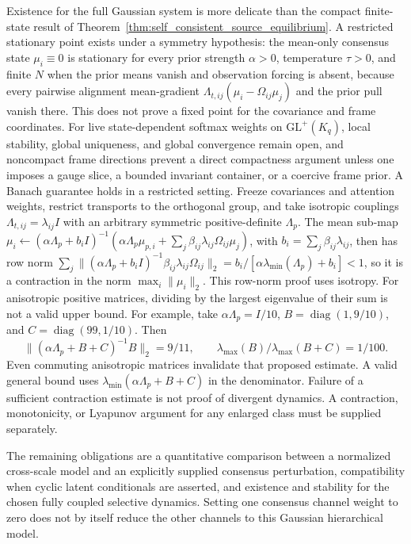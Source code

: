 Existence for the full Gaussian system is more delicate than the compact finite-state result of Theorem~\ref{thm:self_consistent_source_equilibrium}. A restricted stationary point exists under a symmetry hypothesis: the mean-only consensus state $\mu_i \equiv 0$ is stationary for every prior strength $\alpha>0$, temperature $\tau>0$, and finite $N$ when the prior means vanish and observation forcing is absent, because every pairwise alignment mean-gradient $\Lambda_{t,ij}(\mu_i-\Omega_{ij}\mu_j)$ and the prior pull vanish there. This does not prove a fixed point for the covariance and frame coordinates. For live state-dependent softmax weights on $\mathrm{GL}^+(K_q)$, local stability, global uniqueness, and global convergence remain open, and noncompact frame directions prevent a direct compactness argument unless one imposes a gauge slice, a bounded invariant container, or a coercive frame prior. A Banach guarantee holds in a restricted setting. Freeze covariances and attention weights, restrict transports to the orthogonal group, and take isotropic couplings $\Lambda_{t,ij}=\lambda_{ij}I$ with an arbitrary symmetric positive-definite $\Lambda_p$. The mean sub-map $\mu_i\leftarrow(\alpha\Lambda_p+b_iI)^{-1}(\alpha\Lambda_p\mu_{p,i}+\sum_j\beta_{ij}\lambda_{ij}\Omega_{ij}\mu_j)$, with $b_i=\sum_j\beta_{ij}\lambda_{ij}$, then has row norm $\sum_j\|(\alpha\Lambda_p+b_iI)^{-1}\beta_{ij}\lambda_{ij}\Omega_{ij}\|_2=b_i/[\alpha\lambda_{\min}(\Lambda_p)+b_i]<1$, so it is a contraction in the norm $\max_i\|\mu_i\|_2$. This row-norm proof uses isotropy. For anisotropic positive matrices, dividing by the largest eigenvalue of their sum is not a valid upper bound. For example, take $\alpha\Lambda_p=I/10$, $B=\operatorname{diag}(1,9/10)$, and $C=\operatorname{diag}(99,1/10)$. Then
\[
\|(\alpha\Lambda_p+B+C)^{-1}B\|_2=9/11,
\qquad
\lambda_{\max}(B)/\lambda_{\max}(B+C)=1/100.
\]
Even commuting anisotropic matrices invalidate that proposed estimate. A valid general bound uses $\lambda_{\min}(\alpha\Lambda_p+B+C)$ in the denominator. Failure of a sufficient contraction estimate is not proof of divergent dynamics. A contraction, monotonicity, or Lyapunov argument for any enlarged class must be supplied separately.

The remaining obligations are a quantitative comparison between a normalized cross-scale model and an explicitly supplied consensus perturbation, compatibility when cyclic latent conditionals are asserted, and existence and stability for the chosen fully coupled selective dynamics. Setting one consensus channel weight to zero does not by itself reduce the other channels to this Gaussian hierarchical model.
